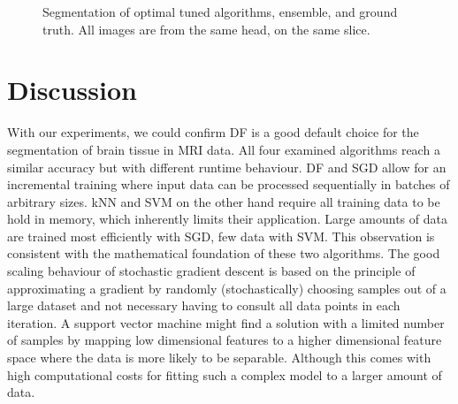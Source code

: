 \documentclass[journal]{IEEEtran}
\begin{document}
\begin{figure}[h!]
	\hfill
	\hfill
	\caption{Segmentation of optimal tuned algorithms, ensemble, and ground truth. All images are from the same head, on the same slice. }
	\label{f.slices_all}
\end{figure}

\section{Discussion}
With our experiments, we could confirm DF is a good default choice for the segmentation of brain tissue in MRI data. All four examined algorithms reach a similar accuracy but with different runtime behaviour. DF and SGD allow for an incremental training where input data can be processed sequentially in batches of arbitrary sizes. kNN and SVM on the other hand require all training data to be hold in memory, which inherently limits their application. Large amounts of data are trained most efficiently with SGD, few data with SVM. This observation is consistent with the mathematical foundation of these two algorithms. The good scaling behaviour of stochastic gradient descent is based on the principle of approximating a gradient by randomly (stochastically) choosing samples out of a large dataset and not necessary having to consult all data points in each iteration. A support vector machine might find a solution with a limited number of samples by mapping low dimensional features to a higher dimensional feature space where the data is more likely to be separable. Although this comes with high computational costs for fitting such a complex model to a larger amount of data.
\end{document}
